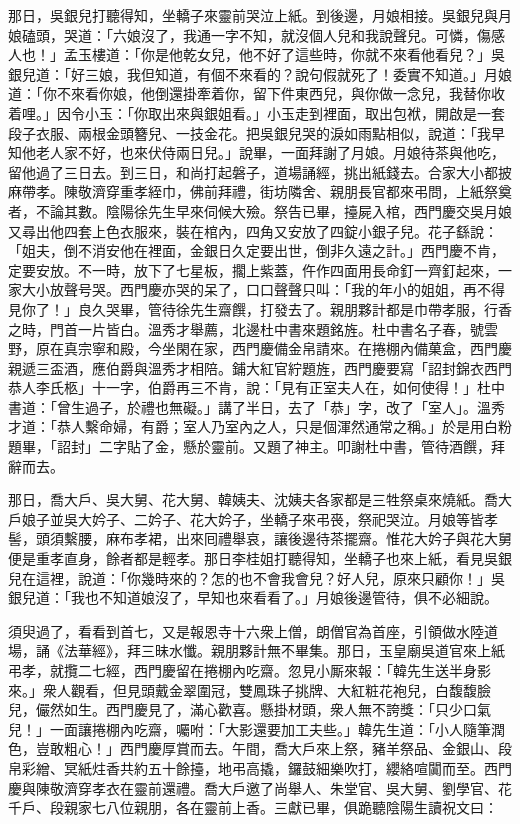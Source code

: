 那日，吳銀兒打聽得知，坐轎子來靈前哭泣上紙。到後邊，月娘相接。吳銀兒與月娘磕頭，哭道：「六娘沒了，我通一字不知，就沒個人兒和我說聲兒。可憐，傷感人也！」孟玉樓道：「你是他乾女兒，他不好了這些時，你就不來看他看兒？」吳銀兒道：「好三娘，我但知道，有個不來看的？說句假就死了！委實不知道。」月娘道：「你不來看你娘，他倒還掛牽着你，留下件東西兒，與你做一念兒，我替你收着哩。」因令小玉：「你取出來與銀姐看。」小玉走到裡面，取出包袱，開啟是一套段子衣服、兩根金頭簪兒、一技金花。把吳銀兒哭的淚如雨點相似，{}說道：「我早知他老人家不好，也來伏侍兩日兒。」說畢，一面拜謝了月娘。月娘待茶與他吃，留他過了三日去。到三日，和尚打起磐子，道場誦經，挑出紙錢去。合家大小都披麻帶孝。陳敬濟穿重孝絰巾，佛前拜禮，街坊隣舍、親朋長官都來弔問，上紙祭奠者，不論其數。陰陽徐先生早來伺候大殮。祭告已畢，擡屍入棺，西門慶交吳月娘又尋出他四套上色衣服來，裝在棺內，四角又安放了四錠小銀子兒。花子繇說：「姐夫，倒不消安他在裡面，金銀日久定要出世，倒非久遠之計。」西門慶不肯，定要安放。不一時，放下了七星板，擱上紫蓋，仵作四面用長命釘一齊釘起來，一家大小放聲号哭。西門慶亦哭的呆了，口口聲聲只叫：「我的年小的姐姐，再不得見你了！」良久哭畢，管待徐先生齋饌，打發去了。親朋夥計都是巾帶孝服，行香之時，門首一片皆白。溫秀才舉薦，北邊杜中書來題銘旌。杜中書名子春，號雲野，原在真宗寧和殿，今坐閑在家，西門慶備金帛請來。在捲棚內備菓盒，西門慶親遞三盃酒，應伯爵與溫秀才相陪。鋪大紅官紵題旌，西門慶要寫「詔封錦衣西門恭人李氏柩」十一字，伯爵再三不肯，說：「見有正室夫人在，如何使得！」{}杜中書道：「曾生過子，於禮也無礙。」講了半日，去了「恭」字，改了「室人」。溫秀才道：「恭人繫命婦，有爵；室人乃室內之人，只是個渾然通常之稱。」於是用白粉題畢，「詔封」二字貼了金，懸於靈前。又題了神主。叩謝杜中書，管待酒饌，拜辭而去。

那日，喬大戶、吳大舅、花大舅、韓姨夫、沈姨夫各家都是三牲祭桌來燒紙。喬大戶娘子並吳大妗子、二妗子、花大妗子，坐轎子來弔䘮，祭祀哭泣。月娘等皆孝髻，頭須繫腰，麻布孝裙，出來囘禮舉哀，讓後邊待茶擺齋。惟花大妗子與花大舅便是重孝直身，餘者都是輕孝。那日李桂姐打聽得知，坐轎子也來上紙，看見吳銀兒在這裡，說道：「你幾時來的？怎的也不會我會兒？好人兒，原來只顧你！」吳銀兒道：「我也不知道娘沒了，早知也來看看了。」月娘後邊管待，俱不必細說。

須臾過了，看看到首七，又是報恩寺十六衆上僧，朗僧官為首座，引領做水陸道場，誦《法華經》，拜三昧水懺。親朋夥計無不畢集。那日，玉皇廟吳道官來上紙弔孝，就攬二七經，西門慶留在捲棚內吃齋。忽見小厮來報：「韓先生送半身影來。」衆人觀看，但見頭戴金翠圍冠，雙鳳珠子挑牌、大紅粧花袍兒，白馥馥臉兒，儼然如生。西門慶見了，滿心歡喜。懸掛材頭，衆人無不誇獎：「只少口氣兒！」一面讓捲棚內吃齋，囑咐：「大影還要加工夫些。」韓先生道：「小人隨筆潤色，豈敢粗心！」西門慶厚賞而去。午間，喬大戶來上祭，豬羊祭品、金銀山、段帛彩繒、冥紙炷香共約五十餘擡，地弔高撬，鑼鼓細樂吹打，纓絡喧闐而至。西門慶與陳敬濟穿孝衣在靈前還禮。喬大戶邀了尚舉人、朱堂官、吳大舅、劉學官、花千戶、段親家七八位親朋，各在靈前上香。三獻已畢，俱跪聽陰陽生讀祝文曰：

